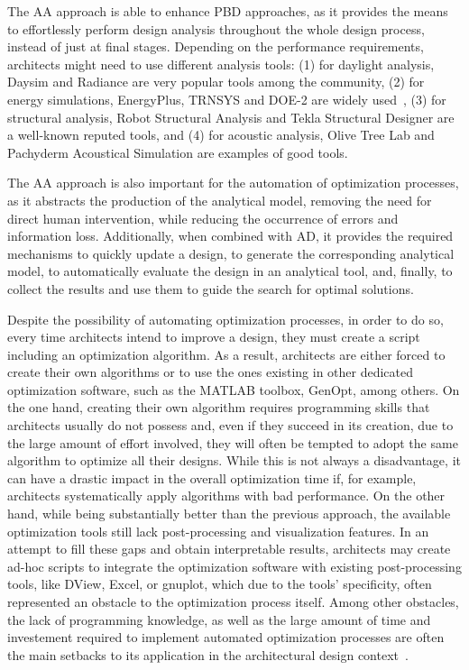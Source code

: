 The \ac{AA} approach is able to enhance \ac{PBD} approaches, as it provides the means to effortlessly perform design analysis throughout the whole design process, instead of just at final stages. Depending on the performance requirements, architects might need to use different analysis tools: (1) for daylight analysis, Daysim and Radiance are very popular tools among the community, (2) for energy simulations, EnergyPlus, TRNSYS and DOE-2 are widely used~\cite{Nguyen2014}, (3) for structural analysis, Robot Structural Analysis and Tekla Structural Designer are a well-known reputed tools, and (4) for acoustic analysis, Olive Tree Lab and Pachyderm Acoustical Simulation are examples of good tools.%

The \ac{AA} approach is also important for the automation of optimization processes, as it abstracts the production of the analytical model, removing the need for direct human intervention, while reducing the occurrence of errors and information loss. Additionally, when combined with \ac{AD}, it provides the required mechanisms to quickly update a design, to generate the corresponding analytical model, to automatically evaluate the design in an analytical tool, and, finally, to collect the results and use them to guide the search for optimal solutions. 

Despite the possibility of automating optimization processes, in order to do so, every time  architects intend to improve a design, they must create a script including an optimization algorithm. As a result, architects are either forced to create their own algorithms or to use the ones existing in other dedicated optimization software, such as the MATLAB toolbox, GenOpt, among others. On the one hand, creating their own algorithm requires programming skills that architects usually do not possess and, even if they succeed in its creation, due to the large amount of effort involved, they will often be tempted to adopt the same algorithm to optimize all their designs. While this is not always a disadvantage, it can have a drastic impact in the overall optimization time if, for example, architects systematically apply algorithms with bad performance. On the other hand, while being substantially better than the previous approach, the available optimization tools still lack post-processing and visualization features. In an attempt to fill these gaps and obtain interpretable results, architects may create ad-hoc scripts to integrate the optimization software with existing post-processing tools, like DView, Excel, or gnuplot, which due to the tools' specificity, often represented an obstacle to the optimization process itself. Among other obstacles, the lack of programming knowledge, as well as the large amount of time and investement required to implement automated optimization processes are often the main setbacks to its application in the architectural design context~\cite{Attia2013}. 

